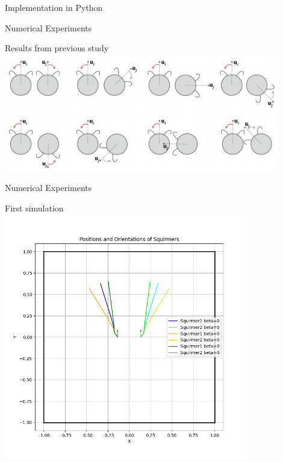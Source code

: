\documentclass{beamer}
\begin{document}
\begin{frame}{Implementation in Python}
    
\end{frame}

\begin{frame}{Numerical Experiments}
    \begin{center}
        Results from previous study \cite{Stark}
        \includegraphics[width=0.9\textwidth]{../images/stark_behavior.png}
        \cite{Stark}
    \end{center}
\end{frame}

\begin{frame}{Numerical Experiments}
    \begin{center}
        First simulation
        \includegraphics[width=0.8\textwidth]{../../graphs/simulations/twosquirmerinter/sq2.pi.2.png}
    \end{center}
\end{frame}
\end{document}
